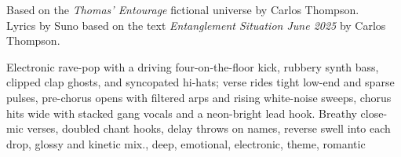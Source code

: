 

\begin{notes}
Based on the \emph{Thomas’ Entourage} fictional universe by Carlos Thompson.\\
Lyrics by Suno based on the text \emph{Entanglement Situation June 2025} by Carlos Thompson.
\end{notes}

\begin{style}
Electronic rave-pop with a driving four-on-the-floor kick, rubbery synth bass, clipped clap ghosts, and syncopated hi-hats; verse rides tight low-end and sparse pulses, pre-chorus opens with filtered arps and rising white-noise sweeps, chorus hits wide with stacked gang vocals and a neon-bright lead hook. %
Breathy close-mic verses, doubled chant hooks, delay throws on names, reverse swell into each drop, glossy and kinetic mix., deep, emotional, electronic, theme, romantic
\end{style}

